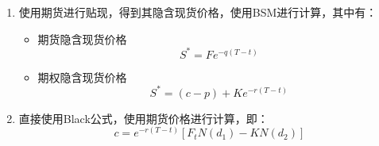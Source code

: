 \documentclass[11pt]{article}
\begin{document}
\begin{enumerate}
    \item 使用期货进行贴现，得到其隐含现货价格，使用BSM进行计算，其中有：
          \begin{itemize}
              \item 期货隐含现货价格
                    \begin{equation*}
                        S^* = F e^{-q(T-t)}
                    \end{equation*}
              \item 期权隐含现货价格
                    \begin{equation*}
                        S^* = (c-p) + Ke^{-r(T-t)}
                    \end{equation*}
          \end{itemize}
    \item 直接使用Black公式，使用期货价格进行计算，即：
          \begin{equation*}
              c = e^{-r(T-t)} \left[ F_t N(d_1)-K N(d_2) \right]
          \end{equation*}
\end{enumerate}
\end{document}
